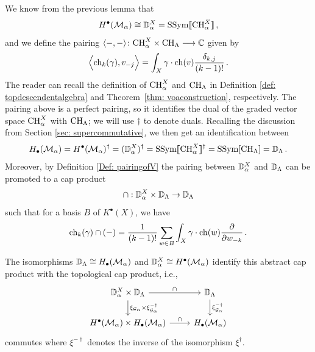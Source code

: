 \documentclass[a4paper, 12pt]{amsart}
\begin{document}
We know from the previous lemma that
$$
H^\bullet({\mathcal M}_\alpha) \cong {\mathbb{D}}^X_\alpha =\text{SSym}\llbracket \text{CH}^X_\alpha\rrbracket \,,
$$
and we define the pairing $
\langle -,-\rangle \colon \text{CH}^X_{\alpha}\times \text{CH}_{\Lambda} \longrightarrow {\mathbb{C}}
$
given by \begin{equation}
\label{Eq: capproductchk}
\Big\langle\mathrm{ch}_{k}(\gamma),v_{-j}\Big\rangle  =\int_X\gamma \cdot \mathrm{ch}(v) \frac{\delta_{k,j}}{(k-1)!}\,.
\end{equation}
The reader can recall the definition of $\text{CH}^X_\alpha$ and $\text{CH}_\Lambda$ in Definition \ref{def: topdescendentalgebra} and Theorem~\ref{thm: voaconstruction}, respectively. The pairing above is a perfect pairing, so it identifies the dual of the graded vector space $\text{CH}^X_\alpha$ with $\text{CH}_\Lambda$; we will use $\dagger$ to denote duals. Recalling the discussion from Section \ref{sec: supercommutative}, we then get an identification between
\[H_\bullet({\mathcal M}_\alpha)=H^\bullet({\mathcal M}_\alpha)^\dagger=
({\mathbb{D}}_\alpha^X)^\dagger=\text{SSym}\llbracket\text{CH}_\alpha^X\rrbracket ^\dagger=\text{SSym}[\text{CH}_\Lambda]={\mathbb{D}}_\Lambda\,.\]
Moreover, by Definition \ref{Def: pairingofV} the pairing between ${\mathbb{D}}_\alpha^X$ and ${\mathbb{D}}_\Lambda$ can be promoted to a cap product
$$\cap:{\mathbb{D}}^X_{\alpha}\times {\mathbb{D}}_{\Lambda}\to {\mathbb{D}}_{\Lambda}$$
such that for a basis $B$ of $K^\bullet(X)$, we have
\begin{equation}\label{eq: capdescendents}
\mathrm{ch}_{k}(\gamma)\cap(-)=\frac{1}{(k-1)!}\sum_{w\in B}\int_X\gamma\cdot \mathrm{ch}(w)\frac{\partial}{\partial w_{-k}}\,.
\end{equation}

The isomorphisms ${\mathbb{D}}_{\Lambda}\cong H_\bullet({\mathcal M}_\alpha)$ and ${\mathbb{D}}_{\alpha}^X\cong H^\bullet({\mathcal M}_\alpha)$ identify this abstract cap product with the topological cap product, i.e.,
\begin{equation}
\label{Eq: homologyisomorphism}
\begin{tikzcd}
\BD^X_{\alpha}\times \arrow[d,"{\xi_{\CG_{\alpha}}\times \xi_{\CG_{\alpha}}^{-\dagger}}"]\BD_{\Lambda}\arrow[r,"\cap"]&\BD_{\Lambda}\arrow[d,"{\xi_{\CG_{\alpha}}^{-\dagger}}"]\\
H^\bullet(\CM_{\alpha})\times H_\bullet(\CM_{\alpha})\arrow[r,"\cap"]&H_\bullet(\CM_{\alpha})
\end{tikzcd}
\end{equation}
commutes where $\xi^{-\dagger}$ denotes the inverse of the isomorphism $\xi^{\dagger}$. 
\end{document}
